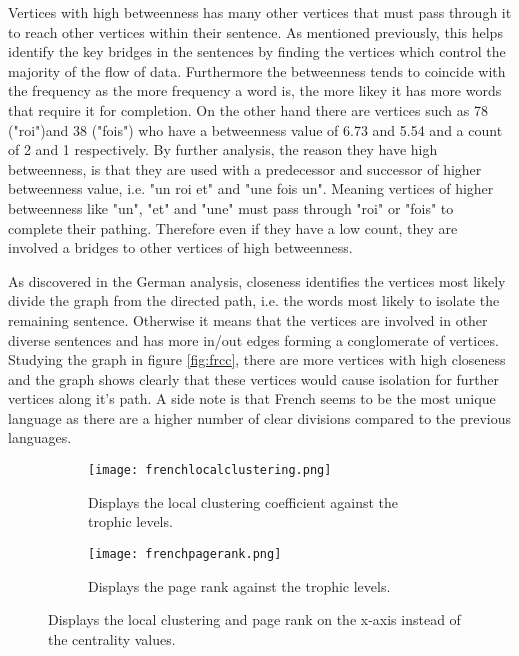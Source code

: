 Vertices with high betweenness has many other vertices that must pass through it to reach other vertices within their sentence. As mentioned previously, this helps identify the key bridges in the sentences by finding the vertices which control the majority of the flow of data. Furthermore the betweenness tends to coincide with the frequency as the more frequency a word is, the more likey it has more words that require it for completion. On the other hand there are vertices such as 78 ("roi")and 38 ("fois") who have a betweenness value of 6.73 and 5.54 and a count of 2 and 1 respectively. By further analysis, the reason they have high betweenness, is that they are used with a predecessor and successor of higher betweenness value, i.e. "un roi et" and "une fois un". Meaning vertices of higher betweenness like "un", "et" and "une" must pass through "roi" or "fois" to complete their pathing. Therefore even if they have a low count, they are involved a bridges to other vertices of high betweenness.

As discovered in the German analysis, closeness identifies the vertices most likely divide the graph from the directed path, i.e. the words most likely to isolate the remaining sentence. Otherwise it means that the vertices are involved in other diverse sentences and has more in/out edges forming a conglomerate of vertices. Studying the graph in figure \ref{fig:frcc}, there are more vertices with high closeness and the graph shows clearly that these vertices would cause isolation for further vertices along it's path. A side note is that French seems to be the most unique language as there are a higher number of clear divisions compared to the previous languages. 

\begin{figure}[H]
\centering
\begin{subfigure}{.45\textwidth}
	\hspace{-1cm} 
	\texttt{[image: frenchlocalclustering.png]}
	\caption{Displays the local clustering coefficient against the trophic levels.}
	\label{fig:frlc}
\end{subfigure}
\hfill
\begin{subfigure}{.45\textwidth}
	\hspace{-1cm} 
	\texttt{[image: frenchpagerank.png]}
	\caption{Displays the page rank against the trophic levels.}
	\label{fig:frpr}
\end{subfigure}
\caption{Displays the local clustering and page rank on the x-axis instead of the centrality values.}
\label{fig:frother}
\end{figure}

